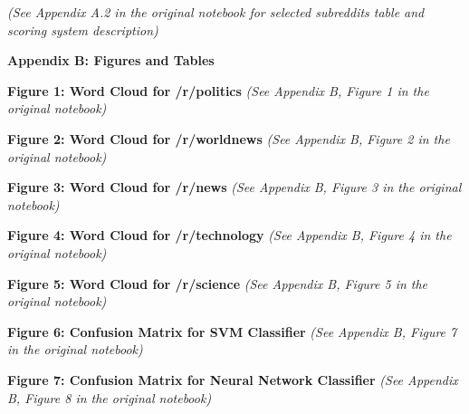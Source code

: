 \documentclass[
  12pt,
  letterpaper,
  DIV=11,
  numbers=noendperiod]{scrartcl}
\begin{document}
\emph{(See Appendix A.2 in the original notebook for selected subreddits
table and scoring system description)}

\textbf{Appendix B: Figures and Tables}

\textbf{Figure 1: Word Cloud for /r/politics} \emph{(See Appendix B,
Figure 1 in the original notebook)}

\textbf{Figure 2: Word Cloud for /r/worldnews} \emph{(See Appendix B,
Figure 2 in the original notebook)}

\textbf{Figure 3: Word Cloud for /r/news} \emph{(See Appendix B, Figure
3 in the original notebook)}

\textbf{Figure 4: Word Cloud for /r/technology} \emph{(See Appendix B,
Figure 4 in the original notebook)}

\textbf{Figure 5: Word Cloud for /r/science} \emph{(See Appendix B,
Figure 5 in the original notebook)}

\textbf{Figure 6: Confusion Matrix for SVM Classifier} \emph{(See
Appendix B, Figure 7 in the original notebook)}

\textbf{Figure 7: Confusion Matrix for Neural Network Classifier}
\emph{(See Appendix B, Figure 8 in the original notebook)}
\end{document}
